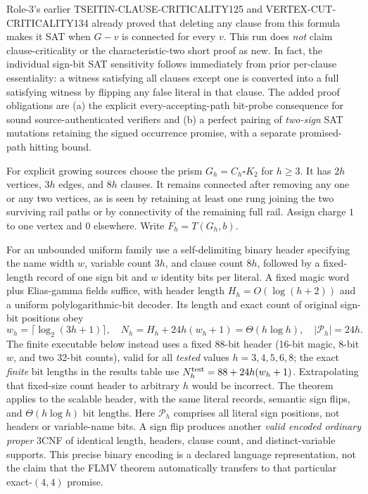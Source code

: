 \documentclass[11pt]{article}
\begin{document}
Role-3's earlier TSEITIN-CLAUSE-CRITICALITY125 and VERTEX-CUT-CRITICALITY134 already proved that deleting any clause from this formula makes it SAT when $G-v$ is connected for every $v$. This run does \emph{not} claim clause-criticality or the characteristic-two short proof as new. In fact, the individual sign-bit SAT sensitivity follows immediately from prior per-clause essentiality: a witness satisfying all clauses except one is converted into a full satisfying witness by flipping any false literal in that clause. The added proof obligations are (a) the explicit every-accepting-path bit-probe consequence for sound source-authenticated verifiers and (b) a perfect pairing of \emph{two-sign} SAT mutations retaining the signed occurrence promise, with a separate promised-path hitting bound.

For explicit growing sources choose the prism $G_h=C_h\square K_2$ for $h\ge3$. It has $2h$ vertices, $3h$ edges, and $8h$ clauses. It remains connected after removing any one or any two vertices, as is seen by retaining at least one rung joining the two surviving rail paths or by connectivity of the remaining full rail. Assign charge $1$ to one vertex and $0$ elsewhere. Write $F_h=T(G_h,b)$.

For an unbounded uniform family use a self-delimiting binary header specifying the name width $w$, variable count $3h$, and clause count $8h$, followed by a fixed-length record of one sign bit and $w$ identity bits per literal. A fixed magic word plus Elias-gamma fields suffice, with header length $H_h=O(\log(h+2))$ and a uniform polylogarithmic-bit decoder. Its length and exact count of original sign-bit positions obey
\[
 w_h=\lceil\log_2(3h+1)\rceil,\quad
 N_h=H_h+24h(w_h+1)=\Theta(h\log h),
 \quad |\mathcal P_h|=24h.\tag{2}
\]
The finite executable below instead uses a fixed 88-bit header (16-bit magic, 8-bit $w$, and two 32-bit counts), valid for all \emph{tested} values $h=3,4,5,6,8$; the exact \emph{finite} bit lengths in the results table use $N_h^{\rm test}=88+24h(w_h+1)$. Extrapolating that fixed-size count header to arbitrary $h$ would be incorrect. The theorem applies to the scalable header, with the same literal records, semantic sign flips, and $\Theta(h\log h)$ bit lengths. Here $\mathcal P_h$ comprises all literal sign positions, not headers or variable-name bits. A sign flip produces another \emph{valid encoded ordinary proper} 3CNF of identical length, headers, clause count, and distinct-variable supports. This precise binary encoding is a declared language representation, not the claim that the FLMV theorem automatically transfers to that particular exact-$(4,4)$ promise.
\end{document}
